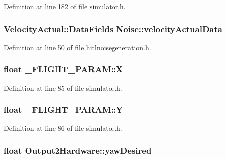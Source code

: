 \-Definition at line 182 of file simulator.\-h.

\hypertarget{group___h_i_t_l_plugin_ga45f843b87142396306b05148bf19b766}{
\subsubsection[{velocity\-Actual\-Data}]{\setlength{\rightskip}{0pt plus 5cm}\-Velocity\-Actual\-::\-Data\-Fields {\bf \-Noise\-::velocity\-Actual\-Data}}}\label{group___h_i_t_l_plugin_ga45f843b87142396306b05148bf19b766}


\-Definition at line 50 of file hitlnoisegeneration.\-h.

\hypertarget{group___h_i_t_l_plugin_ga55a42deedc5785d55c570ae908bcc46a}{
\subsubsection[{\-X}]{\setlength{\rightskip}{0pt plus 5cm}float {\bf \-\_\-\-F\-L\-I\-G\-H\-T\-\_\-\-P\-A\-R\-A\-M\-::\-X}}}\label{group___h_i_t_l_plugin_ga55a42deedc5785d55c570ae908bcc46a}


\-Definition at line 85 of file simulator.\-h.

\hypertarget{group___h_i_t_l_plugin_gafb4f835313c27ac7b01fe3eb77b6bacc}{
\subsubsection[{\-Y}]{\setlength{\rightskip}{0pt plus 5cm}float {\bf \-\_\-\-F\-L\-I\-G\-H\-T\-\_\-\-P\-A\-R\-A\-M\-::\-Y}}}\label{group___h_i_t_l_plugin_gafb4f835313c27ac7b01fe3eb77b6bacc}


\-Definition at line 86 of file simulator.\-h.

\hypertarget{group___h_i_t_l_plugin_gaf01c33ffb5c7695348739d0070122bd7}{
\subsubsection[{yaw\-Desired}]{\setlength{\rightskip}{0pt plus 5cm}float {\bf \-Output2\-Hardware\-::yaw\-Desired}}}\label{group___h_i_t_l_plugin_gaf01c33ffb5c7695348739d0070122bd7}


